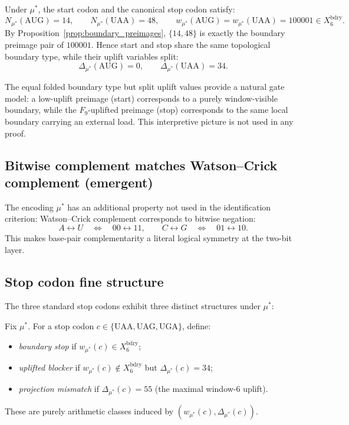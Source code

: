Under $\mu^\ast$, the start codon and the canonical stop codon satisfy:
\[
N_{\mu^\ast}(\mathrm{AUG})=14,\qquad
N_{\mu^\ast}(\mathrm{UAA})=48,
\qquad
w_{\mu^\ast}(\mathrm{AUG})=w_{\mu^\ast}(\mathrm{UAA})=100001\in X_6^{\mathrm{bdry}}.
\]
By Proposition~\ref{prop:boundary_preimages}, $\{14,48\}$ is exactly the boundary preimage pair of $100001$.
Hence start and stop share the same topological boundary type, while their uplift variables split:
\[
\Delta_{\mu^\ast}(\mathrm{AUG})=0,\qquad
\Delta_{\mu^\ast}(\mathrm{UAA})=34.
\]
\begin{remark}
The equal folded boundary type but split uplift values provide a natural gate model: a low-uplift preimage (start) corresponds to a purely window-visible boundary, while the $F_9$-uplifted preimage (stop) corresponds to the same local boundary carrying an external load.
This interpretive picture is not used in any proof.
\end{remark}

\subsection{Bitwise complement matches Watson--Crick complement (emergent)}
\label{sec:bitwise_complement}

The encoding $\mu^\ast$ has an additional property not used in the identification criterion:
Watson--Crick complement corresponds to bitwise negation:
\[
A\leftrightarrow U \quad\Longleftrightarrow\quad 00\leftrightarrow 11,\qquad
C\leftrightarrow G \quad\Longleftrightarrow\quad 01\leftrightarrow 10.
\]
This makes base-pair complementarity a literal logical symmetry at the two-bit layer.
\cite{WatsonCrick1953,Alberts2014}


\subsection{Stop codon fine structure}
\label{sec:stop_fine_structure}

The three standard stop codons exhibit three distinct structures under $\mu^\ast$:
\begin{definition}
\label{def:stop_classes}
Fix $\mu^\ast$.
For a stop codon $c\in\{\mathrm{UAA,UAG,UGA}\}$, define:
\begin{itemize}
\item \emph{boundary stop} if $w_{\mu^\ast}(c)\in X_6^{\mathrm{bdry}}$;
\item \emph{uplifted blocker} if $w_{\mu^\ast}(c)\notin X_6^{\mathrm{bdry}}$ but $\Delta_{\mu^\ast}(c)=34$;
\item \emph{projection mismatch} if $\Delta_{\mu^\ast}(c)=55$ (the maximal window-$6$ uplift).
\end{itemize}
These are purely arithmetic classes induced by $(w_{\mu^\ast}(c),\Delta_{\mu^\ast}(c))$.
\end{definition}

